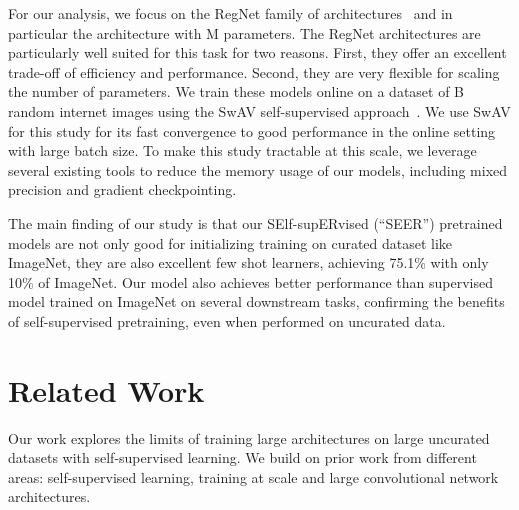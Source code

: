 \documentclass[final]{cvpr}
\begin{document}
For our analysis, we focus on the RegNet family of architectures~\cite{radosavovic2020designing} and in particular the architecture with M parameters.
The RegNet architectures are particularly well suited for this task for two reasons. 
First, they offer an excellent trade-off of efficiency and performance. Second, they are very flexible for scaling the number of parameters.
We train these models online on a dataset of B random internet images using the SwAV self-supervised approach~\cite{caron2020unsupervised}.
We use SwAV for this study for its fast convergence to good performance in the online setting with large batch size.
To make this study tractable at this scale, we leverage several existing tools to reduce the memory usage of our models, including mixed precision and gradient checkpointing.

The main finding of our study is that our SElf-supERvised (``SEER'') pretrained models are not only good for initializing training on curated dataset like ImageNet, they are also excellent few shot learners, achieving 75.1\% with only 10\% of ImageNet.
Our model also achieves better performance than supervised model trained on ImageNet on several downstream tasks, confirming the benefits of self-supervised pretraining, even when performed on uncurated data.

\section{Related Work}

Our work explores the limits of training large architectures on large uncurated datasets with self-supervised learning.
We build on prior work from different areas: self-supervised learning, training at scale and large convolutional network architectures.
\end{document}
